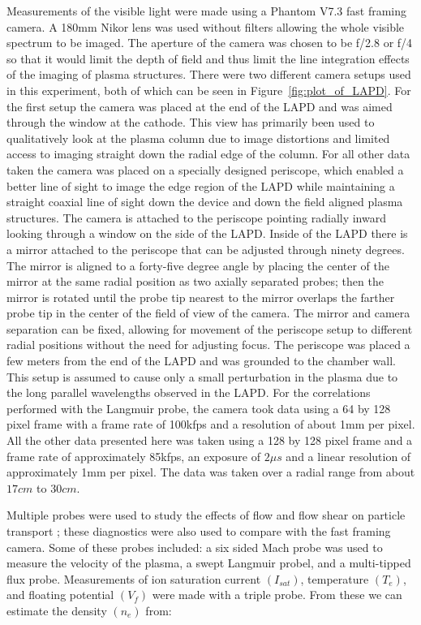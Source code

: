 \documentclass{jpp}
\begin{document}
Measurements of the visible light were made using a Phantom V7.3 fast framing camera. A 180mm Nikor lens was used without filters allowing the whole visible spectrum to be imaged. The aperture of the camera was chosen to be f/2.8 or f/4 so that it would limit the depth of field and thus limit the line integration effects of the imaging of plasma structures. There were two different camera setups used in this experiment, both of which can be seen in Figure~\ref{fig:plot_of_LAPD}.  For the first setup the camera was placed at the end of the LAPD and was aimed through the window at the cathode.  This view has primarily been used to qualitatively look at the plasma column due to image distortions and limited access to imaging straight down the radial edge of the column.  For all other data taken the camera was placed on a specially designed periscope, which enabled a better line of sight to image the edge region of the LAPD while maintaining a straight coaxial line of sight down the device and down the field aligned plasma structures. The camera is attached to the periscope pointing radially inward looking through a window on the side of the LAPD. Inside of the LAPD there is a mirror attached to the periscope that can be adjusted through ninety degrees. The mirror is aligned to a forty-five degree angle by placing the center of the mirror at the same radial position as two axially separated probes; then the mirror is rotated until the probe tip nearest to the mirror overlaps the farther probe tip in the center of the field of view of the camera. The mirror and camera separation can be fixed, allowing for movement of the periscope setup to different radial positions without the need for adjusting focus.  The periscope was placed a few meters from the end of the LAPD and was grounded to the chamber wall.  This setup is assumed to cause only a small perturbation in the plasma due to the long parallel wavelengths observed in the LAPD.  For the correlations performed with the Langmuir probe, the camera took data using a 64 by 128 pixel frame with a frame rate of 100kfps and a resolution of about 1mm per pixel.  All the other data presented here was taken using a 128 by 128 pixel frame and a frame rate of approximately 85kfps, an exposure of $2 \mu s$ and a linear resolution of approximately 1mm per pixel.  The data was taken over a radial range from about $17cm$ to $30cm$.
 
Multiple probes were used to study the effects of flow and flow shear on particle transport \citep{schaffner12, schaffner13}; these diagnostics were also used to compare with the fast framing camera. Some of these probes included: a six sided Mach probe was used to measure the velocity of the plasma, a swept Langmuir probel, and a multi-tipped flux probe. Measurements of ion saturation current $(I_{sat})$, temperature $(T_e)$, and floating potential $(V_f)$ were made with a triple probe. From these we can estimate the density $(n_e)$ from:
\end{document}
